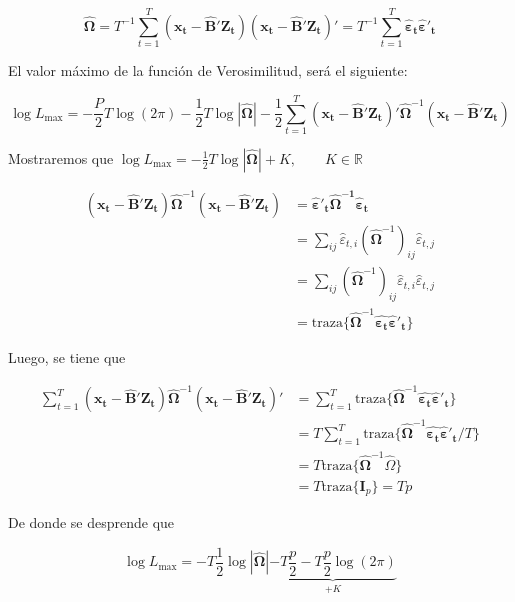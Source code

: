 \documentclass[12pt, twoside]{book}\usepackage[]{graphicx}\usepackage[]{color}
\let\bold\boldsymbol
\numberwithin{equation}{section}
\numberwithin{theorem}{section}
\numberwithin{teorema}{section}
\numberwithin{defi}{section}
\numberwithin{prop}{section}
\numberwithin{defi}{section}
\theoremstyle{plain}
\begin{document}
{\begin{equation}
\boldsymbol{\hat{\Omega}} = T^{-1}\sum_{t=1}^{T}(\bold{x_{t}-\hat{B}'Z_{t}})(\bold{x_{t}-\hat{B}'Z_{t}})' = T^{-1}\sum_{t=1}^{T}\boldsymbol{\hat{\varepsilon}_{t}\hat{\varepsilon}'_{t}}
\end{equation}

El valor máximo de la función de Verosimilitud, será el siguiente: 

\begin{equation}
\log L _{\max} = -\frac{P}{2}T\log (2\pi)-\frac{1}{2}T\log|\boldsymbol{\hat{\Omega}}|-\frac{1}{2}\sum_{t=1}^{T}(\bold{x_{t}-\hat{B}'Z_{t}})'\boldsymbol{\hat{\Omega}}^{-1}(\bold{x_{t}-\hat{B}'Z_{t}}) 
\end{equation}

Mostraremos que $\log L_{\max} = -\frac{1}{2}T\log |\boldsymbol{\hat{\Omega}}|+K, \qquad K\in \mathbb{R}$

\begin{align}
(\boldsymbol{x_{t}-\hat{B}'Z_{t}})\boldsymbol{\hat{\Omega}}^{-1}(\bold{x_{t}-\hat{B}'Z_{t}}) 
& = \boldsymbol{\hat{\varepsilon}'_{t}\boldsymbol{\hat{\Omega}}^{-1}\hat{\varepsilon}_{t}} \nonumber \\
& = \sum_{ij}\hat{\varepsilon}_{t,i}(\boldsymbol{\hat{\Omega}}^{-1})_{ij}\hat{\varepsilon}_{t,j} \\
& = \sum_{ij}(\boldsymbol{\hat{\Omega}}^{-1})_{ij}\hat{\varepsilon}_{t,i}\hat{\varepsilon}_{t,j} \nonumber \\ 
& = \text{traza}\{\boldsymbol{\hat{\Omega}}^{-1}\boldsymbol{\hat{\varepsilon_{t}}\hat{\varepsilon}'_{t}}\}
\end{align}

Luego, se tiene que 

\begin{align}
\sum_{t=1}^{T}(\bold{x_{t}-\hat{B}'Z_{t}})\boldsymbol{\hat{\Omega}}^{-1}(\bold{x_{t}-\hat{B}'Z_{t}})' & = \sum_{t=1}^{T}\text{traza}\{\boldsymbol{\hat{\Omega}}^{-1}\boldsymbol{\hat{\varepsilon_{t}}\hat{\varepsilon}'_{t}}\} \\
& = T \sum_{t=1}^{T}\text{traza}\{\boldsymbol{\hat{\Omega}}^{-1}\boldsymbol{\hat{\varepsilon_{t}}\hat{\varepsilon}'_{t}}/T\} \\ 
& = T \text{traza}\{\boldsymbol{\hat{\Omega}}^{-1}\hat{\Omega}\} \\ 
& = T \text{traza}\{\bold{I}_{p}\} = Tp
\end{align}

De donde se desprende que 

\begin{equation}
\log L_{\max} = -T \frac{1}{2} \log |\boldsymbol{\hat{\Omega}}|\underbrace{-T\frac{p}{2}-T\frac{p}{2}\log(2\pi)}_{+K}
\end{equation}

}
\end{document}
